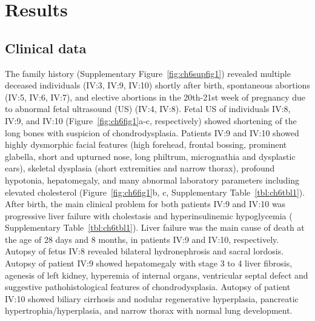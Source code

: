 \section{Results}

\subsection{Clinical data}

The family history (Supplementary Figure~\ref{fig:ch6supfig1}) revealed multiple deceased individuals (IV:3, IV:9, IV:10) shortly after birth, spontaneous abortions (IV:5, IV:6, IV:7), and elective abortions in the 20th-21st week of pregnancy due to abnormal fetal ultrasound (US) (IV:4, IV:8). Fetal US of individuals IV:8, IV:9, and IV:10 (Figure~\ref{fig:ch6fig1}a-c, respectively) showed shortening of the long bones with suspicion of chondrodysplasia. Patients IV:9 and IV:10 showed highly dysmorphic facial features (high forehead, frontal bossing, prominent glabella, short and upturned nose, long philtrum, micrognathia and dysplastic ears), skeletal dysplasia (short extremities and narrow thorax), profound hypotonia, hepatomegaly, and many abnormal laboratory parameters including elevated cholesterol (Figure~\ref{fig:ch6fig1}b, c, Supplementary Table~\ref{tbl:ch6tbl1}). After birth, the main clinical problem for both patients IV:9 and IV:10 was progressive liver failure with cholestasis and hyperinsulinemic hypoglycemia ( Supplementary Table~\ref{tbl:ch6tbl1}). Liver failure was the main cause of death at the age of 28 days and 8 months, in patients IV:9 and IV:10, respectively. Autopsy of fetus IV:8 revealed bilateral hydronephrosis and sacral lordosis. Autopsy of patient IV:9 showed hepatomegaly with stage 3 to 4 liver fibrosis, agenesis of left kidney, hyperemia of internal organs, ventricular septal defect and suggestive pathohistological features of chondrodysplasia. Autopsy of patient IV:10 showed biliary cirrhosis and nodular regenerative hyperplasia, pancreatic hypertrophia/hyperplasia, and narrow thorax with normal lung development.

